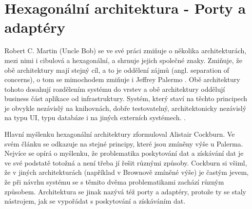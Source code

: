 \section{Hexagonální architektura - Porty a adaptéry}
Robert C. Martin (Uncle Bob) se ve své práci zmiňuje o několika architekturách, mezi nimi i cibulová a hexagonální, a shrnuje jejich společné znaky. Zmiňuje, že obě architektury mají stejný cíl, a to je oddělení zájmů (angl. separation of concerns), o tom se mimochodem zmiňuje i Jeffrey Palermo \cite{palermo}. Obě architektury tohoto dosahují rozdělením systému do vrstev a obě architektury oddělují business část aplikace od infrastruktury. \cite{uncle-bob} Systém, který staví na těchto principech je obvykle nezávislý na knihovnách, dobře testovatelný, architektonicky nezávislý na typu UI, typu databáze i na jiných externích systémech. \cite{uncle-bob}.\par
Hlavní myšlenku hexagonální architektury zformuloval Alistair Cockburn. Ve svém článku se odkazuje na stejné principy, které jsou zmíněny výše u Palerma. Nejvíce se opírá o myšlenku, že problematika poskytování dat a získávání dat je ve své podstatě totožná a není třeba jí řešit různými způsoby. Cockburn si všiml, že v jiných architekturách (například v Brownově zmíněné výše) je častým jevem, že při návrhu systému se s těmito dvěma problematikami zachází různým způsobem. Architektura se jinak nazývá též porty a adaptéry, protože ty se staly nástrojem, jak se vypořádat s poskytování a získáváním dat. \cite{cockburn}\par

